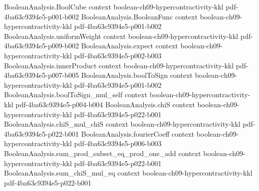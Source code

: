 \begin{theorem}
\leanok
{}
\label{BooleanAnalysis.Hypercontractivity.weak_two_function_hypercontractivity}
\proofstep
  {BooleanAnalysis.BoolCube}
  {context}
  {boolean-ch09-hypercontractivity-kkl}
  {pdf-4ba63c9394e5-p001-b002}
\proofstep
  {BooleanAnalysis.BooleanFunc}
  {context}
  {boolean-ch09-hypercontractivity-kkl}
  {pdf-4ba63c9394e5-p001-b002}
\proofstep
  {BooleanAnalysis.uniformWeight}
  {context}
  {boolean-ch09-hypercontractivity-kkl}
  {pdf-4ba63c9394e5-p009-b002}
\proofstep
  {BooleanAnalysis.expect}
  {context}
  {boolean-ch09-hypercontractivity-kkl}
  {pdf-4ba63c9394e5-p002-b003}
\proofstep
  {BooleanAnalysis.innerProduct}
  {context}
  {boolean-ch09-hypercontractivity-kkl}
  {pdf-4ba63c9394e5-p007-b005}
\proofstep
  {BooleanAnalysis.boolToSign}
  {context}
  {boolean-ch09-hypercontractivity-kkl}
  {pdf-4ba63c9394e5-p001-b002}
\proofstep
  {BooleanAnalysis.boolToSign_mul_self}
  {context}
  {boolean-ch09-hypercontractivity-kkl}
  {pdf-4ba63c9394e5-p004-b004}
\proofstep
  {BooleanAnalysis.chiS}
  {context}
  {boolean-ch09-hypercontractivity-kkl}
  {pdf-4ba63c9394e5-p022-b001}
\proofstep
  {BooleanAnalysis.chiS_mul_chiS}
  {context}
  {boolean-ch09-hypercontractivity-kkl}
  {pdf-4ba63c9394e5-p022-b001}
\proofstep
  {BooleanAnalysis.fourierCoeff}
  {context}
  {boolean-ch09-hypercontractivity-kkl}
  {pdf-4ba63c9394e5-p006-b003}
\proofstep
  {BooleanAnalysis.sum_prod_subset_eq_prod_one_add}
  {context}
  {boolean-ch09-hypercontractivity-kkl}
  {pdf-4ba63c9394e5-p022-b001}
\proofstep
  {BooleanAnalysis.sum_chiS_mul_eq}
  {context}
  {boolean-ch09-hypercontractivity-kkl}
  {pdf-4ba63c9394e5-p022-b001}
\proofstep

\end{theorem}
